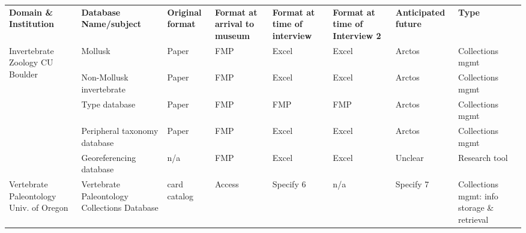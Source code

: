 \begin{table*}[t]
  \centering
\begin{tabular}{llllllll}
\textbf{Domain \& Institution}                           & \textbf{Database Name/subject}               & \textbf{Original format} & \textbf{Format at arrival to museum}     & \textbf{Format at time of interview} & \textbf{Format at time of Interview 2} & \textbf{Anticipated future} & \textbf{Type}                               \\
\multirow{5}{*}{Invertebrate Zoology CU Boulder}         & Mollusk                                      & Paper                    & FMP                                      & Excel                                & Excel                                  & Arctos                      & Collections mgmt                            \\
                                                         & Non-Mollusk invertebrate                     & Paper                    & FMP                                      & Excel                                & Excel                                  & Arctos                      & Collections mgmt                            \\
                                                         & Type database                                & Paper                    & FMP                                      & FMP                                  & FMP                                    & Arctos                      & Collections mgmt                            \\
                                                         & Peripheral taxonomy database                 & Paper                    & FMP                                      & Excel                                & Excel                                  & Arctos                      & Collections mgmt                            \\
                                                         & Georeferencing database                      & n/a                      & FMP                                      & Excel                                & Excel                                  & Unclear                     & Research tool                               \\
\multirow{2}{*}{Vertebrate Paleontology Univ. of Oregon} & Vertebrate Paleontology Collections Database & card catalog             & Access                                   & Specify 6                            & n/a                                    & Specify 7                   & Collections mgmt: info storage \& retrieval \\

\end{tabular}
\end{table*}
